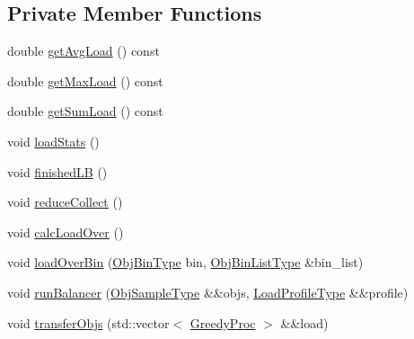 \subsection*{Private Member Functions}
\begin{DoxyCompactItemize}
\item 
double \hyperlink{structvt_1_1vrt_1_1collection_1_1lb_1_1_greedy_l_b_a7c270ad22c0dcc393a6d65c1abe2473d}{get\+Avg\+Load} () const
\item 
double \hyperlink{structvt_1_1vrt_1_1collection_1_1lb_1_1_greedy_l_b_a42b333d301096e303095736507c88b37}{get\+Max\+Load} () const
\item 
double \hyperlink{structvt_1_1vrt_1_1collection_1_1lb_1_1_greedy_l_b_a2e9f213874f7eecc81a09f2b1ceb5291}{get\+Sum\+Load} () const
\item 
void \hyperlink{structvt_1_1vrt_1_1collection_1_1lb_1_1_greedy_l_b_a1d746659b257bc6897976b23deda3f2e}{load\+Stats} ()
\item 
void \hyperlink{structvt_1_1vrt_1_1collection_1_1lb_1_1_greedy_l_b_aaee35fa972c887604c1061d5e73c0380}{finished\+LB} ()
\item 
void \hyperlink{structvt_1_1vrt_1_1collection_1_1lb_1_1_greedy_l_b_afbb460b759e33f8f6e703858d4457cad}{reduce\+Collect} ()
\item 
void \hyperlink{structvt_1_1vrt_1_1collection_1_1lb_1_1_greedy_l_b_a781bd4f7f52451094a9541447ad70d0c}{calc\+Load\+Over} ()
\item 
void \hyperlink{structvt_1_1vrt_1_1collection_1_1lb_1_1_greedy_l_b_a2eebe9945964c405c237ae025d901c93}{load\+Over\+Bin} (\hyperlink{structvt_1_1vrt_1_1collection_1_1lb_1_1_base_l_b_ae0bff8fcf0dec0abc1d81836cf1d060a}{Obj\+Bin\+Type} bin, \hyperlink{structvt_1_1vrt_1_1collection_1_1lb_1_1_base_l_b_ab29c64ca66a928f34cf638dad6163f80}{Obj\+Bin\+List\+Type} \&bin\+\_\+list)
\item 
void \hyperlink{structvt_1_1vrt_1_1collection_1_1lb_1_1_greedy_l_b_a1d99110d1226a5f843aab375e2949b7a}{run\+Balancer} (\hyperlink{structvt_1_1vrt_1_1collection_1_1lb_1_1_base_l_b_a331d7da5bbf2883238427d86b54ddd7b}{Obj\+Sample\+Type} \&\&objs, \hyperlink{structvt_1_1vrt_1_1collection_1_1lb_1_1_greedy_l_b_a3db2c9b36ac99ed4aed38519be4aad60}{Load\+Profile\+Type} \&\&profile)
\item 
void \hyperlink{structvt_1_1vrt_1_1collection_1_1lb_1_1_greedy_l_b_a329b105a21240dd33a53d06080b035da}{transfer\+Objs} (std\+::vector$<$ \hyperlink{structvt_1_1vrt_1_1collection_1_1lb_1_1_greedy_proc}{Greedy\+Proc} $>$ \&\&load)
\item 

\end{DoxyCompactItemize}
